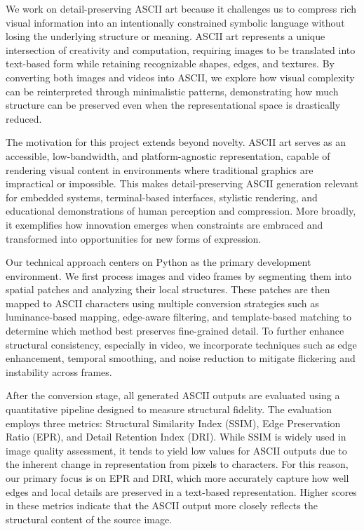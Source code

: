 \documentclass[10pt,twocolumn,letterpaper]{article}
\begin{document}


We work on detail-preserving ASCII art because it challenges us to
compress rich visual information into an intentionally constrained
symbolic language without losing the underlying structure or meaning.
ASCII art represents a unique intersection of creativity and
computation, requiring images to be translated into text-based form
while retaining recognizable shapes, edges, and textures. By converting
both images and videos into ASCII, we explore how visual complexity can
be reinterpreted through minimalistic patterns, demonstrating how much
structure can be preserved even when the representational space is
drastically reduced.

The motivation for this project extends beyond novelty. ASCII art serves
as an accessible, low-bandwidth, and platform-agnostic representation,
capable of rendering visual content in environments where traditional
graphics are impractical or impossible. This makes detail-preserving
ASCII generation relevant for embedded systems, terminal-based
interfaces, stylistic rendering, and educational demonstrations of human
perception and compression. More broadly, it exemplifies how innovation
emerges when constraints are embraced and transformed into opportunities
for new forms of expression.

Our technical approach centers on Python as the primary development
environment. We first process images and video frames by segmenting them
into spatial patches and analyzing their local structures. These patches
are then mapped to ASCII characters using multiple conversion strategies
such as luminance-based mapping, edge-aware filtering, and
template-based matching to determine which method best preserves
fine-grained detail. To further enhance structural consistency,
especially in video, we incorporate techniques such as edge
enhancement, temporal smoothing, and noise reduction to mitigate
flickering and instability across frames.

After the conversion stage, all generated ASCII outputs are evaluated
using a quantitative pipeline designed to measure structural fidelity.
The evaluation employs three metrics: Structural Similarity Index
(SSIM), Edge Preservation Ratio (EPR), and Detail Retention Index (DRI).
While SSIM is widely used in image quality assessment, it tends to yield
low values for ASCII outputs due to the inherent change in
representation from pixels to characters. For this reason, our primary
focus is on EPR and DRI, which more accurately capture how well edges
and local details are preserved in a text-based representation. Higher
scores in these metrics indicate that the ASCII output more closely
reflects the structural content of the source image.
\end{document}
